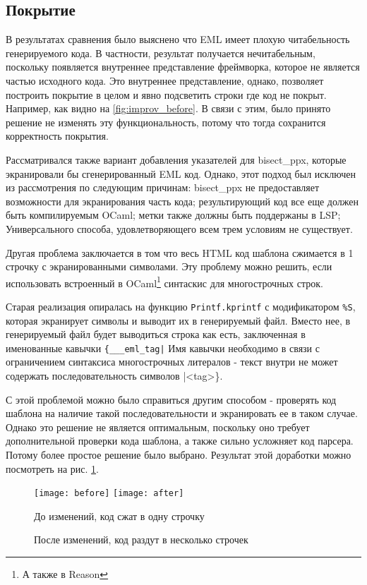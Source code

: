 \subsection{Покрытие}

В результатах сравнения было выяснено что EML имеет плохую читабельность генерируемого кода.
В частности, результат получается нечитабельным, поскольку появляется внутреннее представление фреймворка, которое не является частью исходного кода.
Это внутреннее представление, однако, позволяет построить покрытие в целом и явно подсветить строки где код не покрыт.
Например, как видно на \ref{fig:improv_before}.
В связи с этим, было принято решение не изменять эту функциональность, потому что тогда сохранится корректность покрытия.

Рассматривался также вариант добавления указателей для bisect\_ppx, которые экранировали бы сгенерированный EML код.
Однако, этот подход был исключен из рассмотрения по следующим причинам:
bisect\_ppx не предоставляет возможности для экранирования часть кода;
результирующий код все еще должен быть компилируемым OCaml;
метки также должны быть поддержаны в LSP;
Универсального способа, удовлетворяющего всем трем условиям не существует.

Другая проблема заключается в том что весь HTML код шаблона сжимается в 1 строчку с экранированными символами.
Эту проблему можно решить, если использовать встроенный в OCaml\footnote{А также в Reason} синтаскис для многострочных строк.

Старая реализация опиралась на функцию \lstinline{Printf.kprintf} с модификатором \lstinline{%S}, которая экранирует символы и выводит их в генерируемый файл.
Вместо нее, в генерируемый файл будет выводиться строка как есть, заключенная в именованные кавычки
\lstinline{{___eml_tag|}
Имя кавычки необходимо в связи с ограничением синтаксиса многострочных литералов - текст внутри не может содержать последовательность символов |<tag>\}.

С этой проблемой можно было справиться другим способом - проверять код шаблона на наличие такой последовательности и экранировать ее в таком случае.
Однако это решение не является оптимальным, поскольку оно требует дополнительной проверки кода шаблона, а также сильно усложняет код парсера.
Потому более простое решение было выбрано.
Результат этой доработки можно посмотреть на рис. \ref{fig:improv_after}.

\begin{figure}[h!]
    \texttt{[image: before]}\hfill
    \texttt{[image: after]}\hfill
    \caption{До изменений, код сжат в одну строчку}
    \label{fig:improv_before}
    \caption{После изменений, код раздут в несколько строчек}
    \label{fig:improv_after}
\end{figure}


